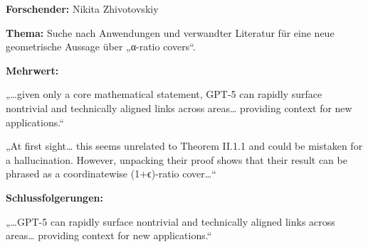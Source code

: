 \documentclass[
  ngerman,
  letterpaper,
  DIV=11]{scrreprt}
\begin{document}
\begin{tcolorbox}[enhanced jigsaw, left=2mm, bottomrule=.15mm, arc=.35mm, rightrule=.15mm, colframe=quarto-callout-note-color-frame, coltitle=black, colback=white, toprule=.15mm, toptitle=1mm, colbacktitle=quarto-callout-note-color!10!white, title=\textcolor{quarto-callout-note-color}{\faInfo}\hspace{0.5em}{Informatik / Geometrie: Literaturrecherche zur Optimierung}, opacitybacktitle=0.6, leftrule=.75mm, bottomtitle=1mm, titlerule=0mm, opacityback=0, breakable]

\textbf{Forschender:} Nikita Zhivotovskiy

\textbf{Thema:} Suche nach Anwendungen und verwandter Literatur für eine
neue geometrische Aussage über „α-ratio covers``.

\textbf{Mehrwert:}

„\ldots given only a core mathematical statement, GPT-5 can rapidly
surface nontrivial and technically aligned links across areas\ldots{}
providing context for new applications.``

„At first sight\ldots{} this seems unrelated to Theorem II.1.1 and could
be mistaken for a hallucination. However, unpacking their proof shows
that their result can be phrased as a coordinatewise (1+ϵ)-ratio
cover\ldots``

\textbf{Schlussfolgerungen:}

„\ldots GPT-5 can rapidly surface nontrivial and technically aligned
links across areas\ldots{} providing context for new applications.``

\end{tcolorbox}
\end{document}

